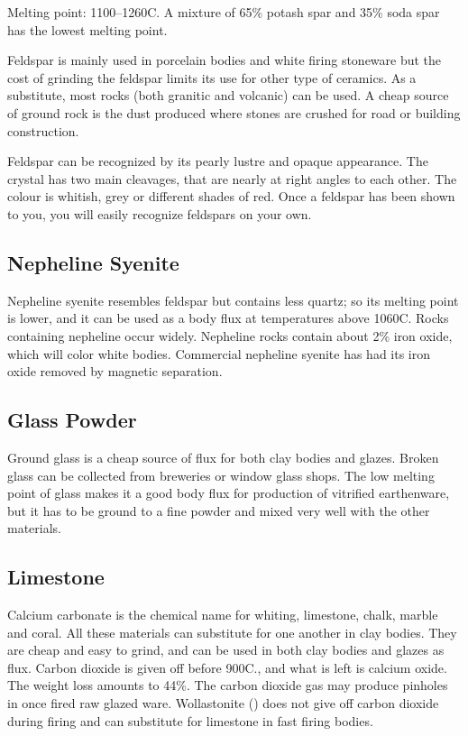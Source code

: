 Melting point: 1100--1260\degree C. A mixture of 65\% potash spar and 
35\% soda spar has the lowest melting point.

Feldspar is mainly used in porcelain bodies and white firing stoneware but the 
cost of grinding the feldspar limits its use for other type of ceramics. As a 
substitute, most rocks (both granitic and volcanic) can be used. A cheap source 
of ground rock is the dust produced where stones are crushed for road or 
building construction.

Feldspar can be recognized by its pearly lustre and opaque appearance. The 
crystal has two main cleavages, that are nearly at right angles to each other. 
The colour is whitish, grey or different shades of red. Once a feldspar has 
been shown to you, you will easily recognize feldspars on your own.
\subsection{Nepheline Syenite}
Nepheline syenite resembles feldspar but contains less quartz; so its melting 
point is lower, and it can be used as a body flux at temperatures above 
1060\degree C. Rocks containing nepheline occur widely. Nepheline rocks contain 
about 2\% iron oxide, which will color white bodies. Commercial nepheline 
syenite has had its iron oxide removed by magnetic separation.
\subsection{Glass Powder}
Ground glass is a cheap source of flux for both clay bodies and glazes. Broken 
glass can be collected from breweries or window glass shops. The low melting 
point of glass makes it a good body flux for production of vitrified 
earthenware, but it has to be ground to a fine powder and mixed very well with 
the other materials.
\subsection{Limestone}
Calcium carbonate is the chemical name for whiting, limestone, chalk, marble 
and coral. All these materials can substitute for one another in clay bodies. 
They are cheap and easy to grind, and can be used in both clay bodies and 
glazes as flux. Carbon dioxide is given off before 900\degree C., and what is 
left is calcium oxide. The weight loss amounts to 44\%. The carbon dioxide gas 
may produce pinholes in once fired raw glazed ware. Wollastonite 
() does not give off carbon dioxide during firing and can 
substitute for limestone in fast firing bodies.

